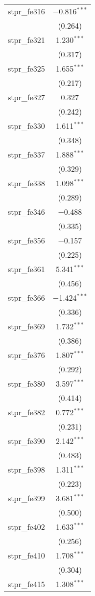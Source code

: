 \begin{table}[!htbp]
\begin{tabular}{@{\extracolsep{5pt}}lc}
  stpr\_fe316 & $-$0.816$^{***}$ \\ 
  & (0.264) \\ 
  stpr\_fe321 & 1.230$^{***}$ \\ 
  & (0.317) \\ 
  stpr\_fe325 & 1.655$^{***}$ \\ 
  & (0.217) \\ 
  stpr\_fe327 & 0.327 \\ 
  & (0.242) \\ 
  stpr\_fe330 & 1.611$^{***}$ \\ 
  & (0.348) \\ 
  stpr\_fe337 & 1.888$^{***}$ \\ 
  & (0.329) \\ 
  stpr\_fe338 & 1.098$^{***}$ \\ 
  & (0.289) \\ 
  stpr\_fe346 & $-$0.488 \\ 
  & (0.335) \\ 
  stpr\_fe356 & $-$0.157 \\ 
  & (0.225) \\ 
  stpr\_fe361 & 5.341$^{***}$ \\ 
  & (0.456) \\ 
  stpr\_fe366 & $-$1.424$^{***}$ \\ 
  & (0.336) \\ 
  stpr\_fe369 & 1.732$^{***}$ \\ 
  & (0.386) \\ 
  stpr\_fe376 & 1.807$^{***}$ \\ 
  & (0.292) \\ 
  stpr\_fe380 & 3.597$^{***}$ \\ 
  & (0.414) \\ 
  stpr\_fe382 & 0.772$^{***}$ \\ 
  & (0.231) \\ 
  stpr\_fe390 & 2.142$^{***}$ \\ 
  & (0.483) \\ 
  stpr\_fe398 & 1.311$^{***}$ \\ 
  & (0.223) \\ 
  stpr\_fe399 & 3.681$^{***}$ \\ 
  & (0.500) \\ 
  stpr\_fe402 & 1.633$^{***}$ \\ 
  & (0.256) \\ 
  stpr\_fe410 & 1.708$^{***}$ \\ 
  & (0.304) \\ 
  stpr\_fe415 & 1.308$^{***}$ \\ 

\end{tabular}
\end{table}
